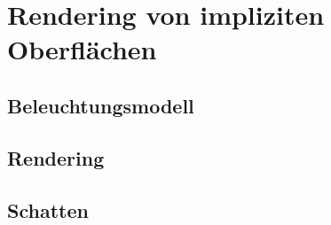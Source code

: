 
\section{Rendering von impliziten Oberflächen}
\label{sec:rendering_implicit_surfaces}

\subsection{Beleuchtungsmodell}
\label{sec:rendering_implicit_surfaces_lighting}

\subsection{Rendering}
\label{sec:rendering_implicit_surfaces_Rendering}

\subsection{Schatten}
\label{sec:rendering_implicit_surfaces_shadows}
